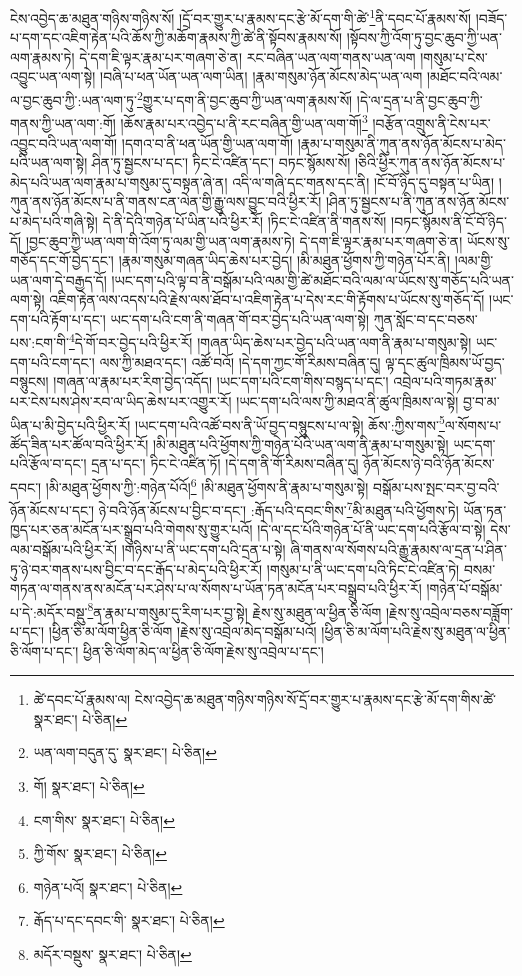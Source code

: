 ངེས་འབྱེད་ཆ་མཐུན་གཉིས་གཉིས་སོ། །དྲོ་བར་གྱུར་པ་རྣམས་དང་རྩེ་མོ་དག་གི་ཚེ་\footnote{ཚེ་དབང་པོ་རྣམས་ལ། ངེས་འབྱེད་ཆ་མཐུན་གཉིས་གཉིས་སོ་དྲོ་བར་གྱུར་པ་རྣམས་དང་རྩེ་མོ་དག་གིས་ཚེ་  སྣར་ཐང་།  པེ་ཅིན། }ནི་དབང་པོ་རྣམས་སོ། །བཟོད་པ་དག་དང་འཇིག་རྟེན་པའི་ཆོས་ཀྱི་མཆོག་རྣམས་ཀྱི་ཚེ་ནི་སྟོབས་རྣམས་སོ། །སྟོབས་ཀྱི་འོག་ཏུ་བྱང་ཆུབ་ཀྱི་ཡན་ལག་རྣམས་ཏེ། དེ་དག་ཇི་ལྟར་རྣམ་པར་གཞག་ཅེ་ན། རང་བཞིན་ཡན་ལག་གནས་ཡན་ལག །གསུམ་པ་ངེས་འབྱུང་ཡན་ལག་སྟེ། །བཞི་པ་ཕན་ཡོན་ཡན་ལག་ཡིན། །རྣམ་གསུམ་ཉོན་མོངས་མེད་ཡན་ལག །མཐོང་བའི་ལམ་ལ་བྱང་ཆུབ་ཀྱི་:ཡན་ལག་ཏུ་\footnote{ཡན་ལག་བདུན་དུ་  སྣར་ཐང་།  པེ་ཅིན། }གྱུར་པ་དག་ནི་བྱང་ཆུབ་ཀྱི་ཡན་ལག་རྣམས་སོ། །དེ་ལ་དྲན་པ་ནི་བྱང་ཆུབ་ཀྱི་གནས་ཀྱི་ཡན་ལག་:གོ། །ཆོས་རྣམ་པར་འབྱེད་པ་ནི་རང་བཞིན་གྱི་ཡན་ལག་གོ།\footnote{གོ།  སྣར་ཐང་།  པེ་ཅིན། } །བརྩོན་འགྲུས་ནི་ངེས་པར་འབྱུང་བའི་ཡན་ལག་གོ། །དགའ་བ་ནི་ཕན་ཡོན་གྱི་ཡན་ལག་གོ། །རྣམ་པ་གསུམ་ནི་ཀུན་ནས་ཉོན་མོངས་པ་མེད་པའི་ཡན་ལག་སྟེ། ཤིན་ཏུ་སྦྱངས་པ་དང་། ཏིང་ངེ་འཛིན་དང་། བཏང་སྙོམས་སོ། །ཅིའི་ཕྱིར་ཀུན་ནས་ཉོན་མོངས་པ་མེད་པའི་ཡན་ལག་རྣམ་པ་གསུམ་དུ་བསྟན་ཞེ་ན། འདི་ལ་གཞི་དང་གནས་དང་ནི། །ངོ་བོ་ཉིད་དུ་བསྟན་པ་ཡིན། །ཀུན་ནས་ཉོན་མོངས་པ་ནི་གནས་ངན་ལེན་གྱི་རྒྱུ་ལས་བྱུང་བའི་ཕྱིར་རོ། །ཤིན་ཏུ་སྦྱངས་པ་ནི་ཀུན་ནས་ཉོན་མོངས་པ་མེད་པའི་གཞི་སྟེ། དེ་ནི་དེའི་གཉེན་པོ་ཡིན་པའི་ཕྱིར་རོ། །ཏིང་ངེ་འཛིན་ནི་གནས་སོ། །བཏང་སྙོམས་ནི་ངོ་བོ་ཉིད་དོ། །བྱང་ཆུབ་ཀྱི་ཡན་ལག་གི་འོག་ཏུ་ལམ་གྱི་ཡན་ལག་རྣམས་ཏེ། དེ་དག་ཇི་ལྟར་རྣམ་པར་གཞག་ཅེ་ན། ཡོངས་སུ་གཅོད་དང་གོ་བྱེད་དང་། །རྣམ་གསུམ་གཞན་ཡིད་ཆེས་པར་བྱེད། །མི་མཐུན་ཕྱོགས་ཀྱི་གཉེན་པོར་ནི། །ལམ་གྱི་ཡན་ལག་དེ་བརྒྱད་དོ། །ཡང་དག་པའི་ལྟ་བ་ནི་བསྒོམ་པའི་ལམ་གྱི་ཚེ་མཐོང་བའི་ལམ་ལ་ཡོངས་སུ་གཅོད་པའི་ཡན་ལག་སྟེ། འཇིག་རྟེན་ལས་འདས་པའི་རྗེས་ལས་ཐོབ་པ་འཇིག་རྟེན་པ་དེས་རང་གི་རྟོགས་པ་ཡོངས་སུ་གཅོད་དོ། །ཡང་དག་པའི་རྟོག་པ་དང་། ཡང་དག་པའི་ངག་ནི་གཞན་གོ་བར་བྱེད་པའི་ཡན་ལག་སྟེ། ཀུན་སློང་བ་དང་བཅས་པས་:ངག་གི་\footnote{ངག་གིས་  སྣར་ཐང་།  པེ་ཅིན། }དེ་གོ་བར་བྱེད་པའི་ཕྱིར་རོ། །གཞན་ཡིད་ཆེས་པར་བྱེད་པའི་ཡན་ལག་ནི་རྣམ་པ་གསུམ་སྟེ། ཡང་དག་པའི་ངག་དང་། ལས་ཀྱི་མཐའ་དང་། འཚོ་བའོ། །དེ་དག་ཀྱང་གོ་རིམས་བཞིན་དུ། ལྟ་དང་ཚུལ་ཁྲིམས་ཡོ་བྱད་བསྙུངས། །གཞན་ལ་རྣམ་པར་རིག་བྱེད་འདོད། །ཡང་དག་པའི་ངག་གིས་བསྙད་པ་དང་། འབྲེལ་པའི་གཏམ་རྣམ་པར་ངེས་པས་ཤེས་རབ་ལ་ཡིད་ཆེས་པར་འགྱུར་རོ། །ཡང་དག་པའི་ལས་ཀྱི་མཐའ་ནི་ཚུལ་ཁྲིམས་ལ་སྟེ། བྱ་བ་མ་ཡིན་པ་མི་བྱེད་པའི་ཕྱིར་རོ། །ཡང་དག་པའི་འཚོ་བས་ནི་ཡོ་བྱད་བསྙུངས་པ་ལ་སྟེ། ཆོས་:ཀྱིས་གས་\footnote{ཀྱི་གོས་  སྣར་ཐང་།  པེ་ཅིན། }ལ་སོགས་པ་ཚོད་ཟིན་པར་ཚོལ་བའི་ཕྱིར་རོ། །མི་མཐུན་པའི་ཕྱོགས་ཀྱི་གཉེན་པོའི་ཡན་ལག་ནི་རྣམ་པ་གསུམ་སྟེ། ཡང་དག་པའི་རྩོལ་བ་དང་། དྲན་པ་དང་། ཏིང་ངེ་འཛིན་ཏོ། །དེ་དག་ནི་གོ་རིམས་བཞིན་དུ། ཉོན་མོངས་ཉེ་བའི་ཉོན་མོངས་དབང་། །མི་མཐུན་ཕྱོགས་ཀྱི་:གཉེན་པོའོ།\footnote{གཉེན་པའོ།  སྣར་ཐང་།  པེ་ཅིན། } །མི་མཐུན་ཕྱོགས་ནི་རྣམ་པ་གསུམ་སྟེ། བསྒོམ་པས་སྤང་བར་བྱ་བའི་ཉོན་མོངས་པ་དང་། ཉེ་བའི་ཉོན་མོངས་པ་བྱིང་བ་དང་། :རྒོད་པའི་དབང་གིས་\footnote{རྒོད་པ་དང་དབང་གི་  སྣར་ཐང་།  པེ་ཅིན། }མི་མཐུན་པའི་ཕྱོགས་ཏེ། ཡོན་ཏན་ཁྱད་པར་ཅན་མངོན་པར་སྒྲུབ་པའི་གེགས་སུ་གྱུར་པའོ། །དེ་ལ་དང་པོའི་གཉེན་པོ་ནི་ཡང་དག་པའི་རྩོལ་བ་སྟེ། དེས་ལམ་བསྒོམ་པའི་ཕྱིར་རོ། །གཉིས་པ་ནི་ཡང་དག་པའི་དྲན་པ་སྟེ། ཞི་གནས་ལ་སོགས་པའི་རྒྱུ་རྣམས་ལ་དྲན་པ་ཤིན་ཏུ་ཉེ་བར་གནས་པས་བྱིང་བ་དང་རྒོད་པ་མེད་པའི་ཕྱིར་རོ། །གསུམ་པ་ནི་ཡང་དག་པའི་ཏིང་ངེ་འཛིན་ཏེ། བསམ་གཏན་ལ་གནས་ནས་མངོན་པར་ཤེས་པ་ལ་སོགས་པ་ཡོན་ཏན་མངོན་པར་བསྒྲུབ་པའི་ཕྱིར་རོ། །གཉེན་པོ་བསྒོམ་པ་དེ་:མདོར་བསྡུ་\footnote{མདོར་བསྡུས་  སྣར་ཐང་།  པེ་ཅིན། }ན་རྣམ་པ་གསུམ་དུ་རིག་པར་བྱ་སྟེ། རྗེས་སུ་མཐུན་ལ་ཕྱིན་ཅི་ལོག །རྗེས་སུ་འབྲེལ་བཅས་བཟློག་པ་དང་། །ཕྱིན་ཅི་མ་ལོག་ཕྱིན་ཅི་ལོག །རྗེས་སུ་འབྲེལ་མེད་བསྒོམ་པའོ། །ཕྱིན་ཅི་མ་ལོག་པའི་རྗེས་སུ་མཐུན་ལ་ཕྱིན་ཅི་ལོག་པ་དང་། ཕྱིན་ཅི་ལོག་མེད་ལ་ཕྱིན་ཅི་ལོག་རྗེས་སུ་འབྲེལ་པ་དང་། 